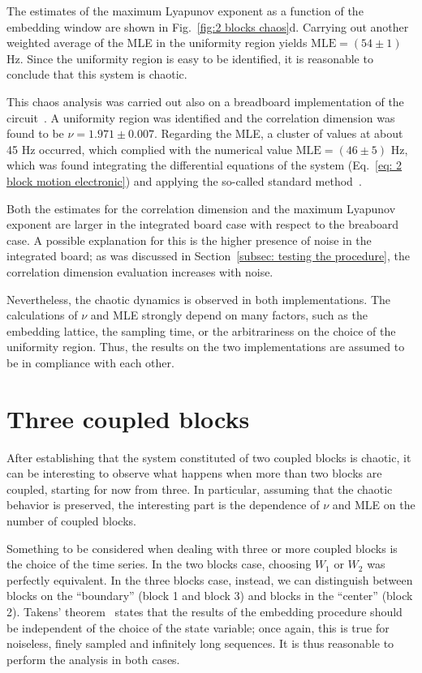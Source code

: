 The estimates of the maximum Lyapunov exponent as a function of the embedding window are shown in
Fig.~\ref{fig:2 blocks chaos}d. Carrying out another weighted average of the MLE in the uniformity region
yields $\text{MLE}=(54\pm1)$ Hz. Since the uniformity region is easy to be identified, it is reasonable
to conclude that this system is chaotic.

This chaos analysis was carried out also on a breadboard implementation of the circuit~\cite{ref:electronic_analog}.
A uniformity region was identified and the correlation dimension was found to be
$\nu=1.971\pm0.007$. Regarding the MLE, a cluster of values at about 45 Hz occurred, which complied
with the numerical value $\text{MLE}=(46\pm5)$ Hz, which was found integrating the differential
equations of the system (Eq.~\ref{eq: 2 block motion electronic}) and applying the so-called
standard method~\cite{benettin1980lyapunov1,benettin1980lyapunov2}.

Both the estimates for the correlation dimension and the maximum Lyapunov exponent are larger
in the integrated board case with respect to the breaboard case.
A possible explanation for this is the higher presence of noise in the integrated board;
as was discussed in Section~\ref{subsec: testing the procedure}, the correlation dimension evaluation
increases with noise.

Nevertheless, the chaotic dynamics is observed in both implementations. The calculations of $\nu$ and
MLE strongly depend on many factors, such as the embedding lattice, the sampling time, or the
arbitrariness on the choice of the uniformity region.
Thus, the results on the two implementations are assumed to be in compliance with each other.


\section{Three coupled blocks}\label{sec: 3 blocks chaos}

After establishing that the system constituted of two coupled blocks is chaotic, it can be interesting
to observe what happens when more than two blocks are coupled, starting for now from three.
In particular, assuming that the chaotic behavior is preserved, the interesting part is the dependence
of $\nu$ and MLE on the number of coupled blocks.

Something to be considered when dealing with three or more coupled blocks is the choice of the time series.
In the two blocks case, choosing $W_1$ or $W_2$ was perfectly equivalent.
In the three blocks case, instead, we can distinguish between blocks on the ``boundary'' (block 1 and
block 3) and blocks in the ``center'' (block 2). Takens' theorem~\cite{ref:takens2006detecting}
states that the results of the embedding procedure should be independent of the choice of the state
variable; once again, this is true for noiseless, finely sampled and infinitely long sequences.
It is thus reasonable to perform the analysis in both cases.


